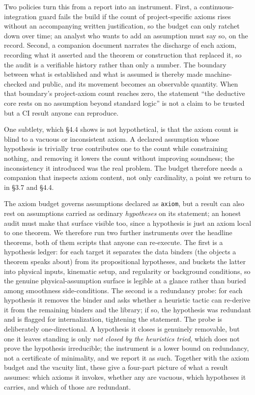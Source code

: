 \documentclass[11pt]{article}
\begin{document}
Two policies turn this from a report into an instrument. First, a continuous-integration guard fails
the build if the count of project-specific axioms rises without an accompanying written justification,
so the budget can only ratchet down over time; an analyst who wants to add an assumption must say so,
on the record. Second, a companion document narrates the discharge of each axiom, recording what it
asserted and the theorem or construction that replaced it, so the audit is a verifiable history rather
than only a number. The boundary between what is established and what is assumed is thereby made
machine-checked and public, and its movement becomes an observable quantity. When that boundary's
project-axiom count reaches zero, the statement ``the deductive core rests on no assumption beyond
standard logic'' is not a claim to be trusted but a CI result anyone can reproduce.

One subtlety, which \S4.4 shows is not hypothetical, is that the axiom count is blind to a vacuous or
inconsistent axiom. A declared assumption whose hypothesis is trivially true contributes one to the
count while constraining nothing, and removing it lowers the count without improving soundness; the
inconsistency it introduced was the real problem. The budget therefore needs a companion that
inspects axiom content, not only cardinality, a point we return to in \S3.7 and \S4.4.

The axiom budget governs assumptions declared as \texttt{axiom}, but a result can also rest on
assumptions carried as ordinary \emph{hypotheses} on its statement; an honest audit must make that
surface visible too, since a hypothesis is just an axiom local to one theorem. We therefore run two
further instruments over the headline theorems, both of them scripts that anyone can re-execute. The
first is a hypothesis ledger: for each target it separates the data binders (the objects a theorem
speaks about) from its propositional hypotheses, and buckets the latter into physical inputs,
kinematic setup, and regularity or background conditions, so the genuine physical-assumption surface
is legible at a glance rather than buried among smoothness side-conditions. The second is a
redundancy probe: for each hypothesis it removes the binder and asks whether a heuristic tactic can
re-derive it from the remaining binders and the library; if so, the hypothesis was redundant and is
flagged for internalization, tightening the statement. The probe is deliberately one-directional. A
hypothesis it closes is genuinely removable, but one it leaves standing is only \emph{not closed by
the heuristics tried}, which does not prove the hypothesis irreducible; the instrument is a lower
bound on redundancy, not a certificate of minimality, and we report it as such. Together with the
axiom budget and the vacuity lint, these give a four-part picture of what a result assumes: which
axioms it invokes, whether any are vacuous, which hypotheses it carries, and which of those are
redundant.
\end{document}
